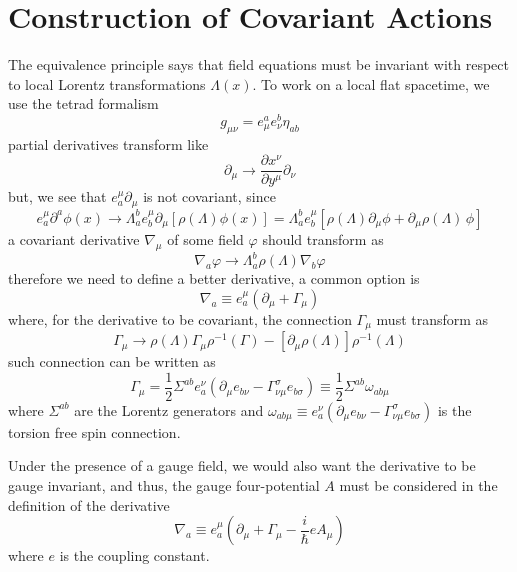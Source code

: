 \section{Construction of Covariant Actions}
The equivalence principle says that field equations must be invariant with respect to local Lorentz transformations $\Lambda(x)$. To work on a local flat spacetime, we use the tetrad formalism
\begin{equation}
	g_{\mu\nu}=e^a_\mu e^b_\nu \eta_{ab}
\end{equation}
partial derivatives transform like
\begin{equation}
	\partial_\mu\to\frac{\partial x^\nu}{\partial y^\mu}\partial_\nu
\end{equation}
but, we see that $e^\mu_a\partial_\mu$ is not covariant, since
\begin{equation}
	e^\mu_a\partial^a\phi(x)\to \Lambda^b_ae^\mu_b\partial_\mu\left[\rho\left(\Lambda\right)\phi(x)\right]= \Lambda^b_ae^\mu_b\left[\rho\left(\Lambda\right)\partial_\mu\phi+\partial_\mu\rho\left(\Lambda\right)\,\phi\right]
\end{equation}
a covariant derivative $\nabla_\mu$ of some field $\varphi$ should transform as
\begin{equation}
	\nabla_a\varphi\to\Lambda_a^b\rho\left(\Lambda\right)\nabla_b\varphi
\end{equation}
therefore we need to define a better derivative, a common option is
\begin{equation}
	\nabla_a\equiv e^\mu_a\left(\partial_\mu+\Gamma_\mu\right)
\end{equation}
where, for the derivative to be covariant, the connection $\Gamma_\mu$ must transform as
\begin{equation}
	\Gamma_\mu\to \rho\left(\Lambda\right)\Gamma_\mu\rho^{-1}\left(\Gamma\right)-\left[\partial_\mu\rho\left(\Lambda\right)\right]\rho^{-1}\left(\Lambda\right)
\end{equation} 
such connection can be written as
\begin{equation}
	\Gamma_\mu=\frac{1}{2}\Sigma^{ab}e^\nu_a\left(\partial_\mu e_{b\nu}-\Gamma^\sigma_{\nu\mu}e_{b\sigma}\right)\equiv \frac{1}{2}\Sigma^{ab}\omega_{ab\mu}
\end{equation}
where $\Sigma^{ab}$ are the Lorentz generators and $\omega_{ab\mu}\equiv e^\nu_a\left(\partial_\mu e_{b\nu}-\Gamma^\sigma_{\nu\mu}e_{b\sigma}\right)$ is the torsion free spin connection.

Under the presence of a gauge field, we would also want the derivative to be gauge invariant, and thus, the gauge four-potential $A$ must be considered in the definition of the derivative
\begin{equation}
	\nabla_a\equiv e^\mu_a\left(\partial_\mu+\Gamma_\mu-\frac{i}{\hbar}eA_\mu\right)
\end{equation}
where $e$ is the coupling constant.
